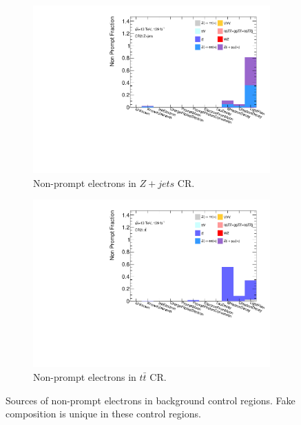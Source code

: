 \begin{figure}[!htb]
    \begin{subfigure}{.48\textwidth}
      \centering
      \includegraphics[width=.9\linewidth]{figures/Analysis/Background/NonPromptComposition_ZplusX_Electrons.pdf}  
      \caption{Non-prompt electrons in $Z+jets$ CR.}
    \end{subfigure}
    \begin{subfigure}{.48\textwidth}
      \centering
      \includegraphics[width=.9\linewidth]{figures/Analysis/Background/NonPromptComposition_ttbar_Electrons.pdf}
      \caption{Non-prompt electrons in $t\bar{t}$ CR.}
    \end{subfigure}
    \caption{Sources of non-prompt electrons in background control regions. Fake composition is unique in these control regions.\label{fig:FakeCompositionCR2LElectron}}
    \end{figure}

